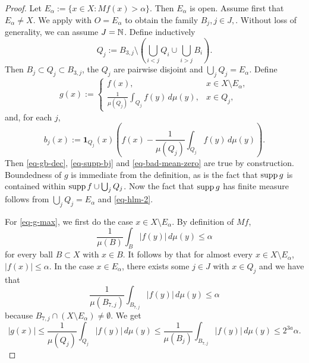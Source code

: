 \begin{proof}
\leanok
Let $E_\alpha:=\{x\in X: Mf(x)>\alpha\}$.
Then $E_\alpha$ is open. Assume first that $E_\alpha \ne X$. We apply  with $O=E_\alpha$ to obtain the family $B_j, j\in J,$. Without loss of generality, we can assume $J={\mathbb{N}}$. Define inductively
\begin{equation}
    Q_j := B_{3,j} \setminus \left(\bigcup_{i<j} Q_i \cup \bigcup_{i>j} B_i \right).
\end{equation}
Then $B_j\subset Q_j\subset B_{3,j}$, the $Q_j$ are pairwise disjoint and $\bigcup_j Q_j = E_\alpha$.
Define
\begin{equation}
    \label{eq-g-def}
    g(x):=\begin{cases}
     f(x), & x\in X\setminus E_\alpha,\\
     \frac{1}{\mu(Q_j)}\int_{Q_j} f(y)\, d\mu(y), &x\in Q_j,
    \end{cases}
\end{equation}
and, for each $j$,
\begin{equation}
    b_j(x):= \mathbf{1}_{Q_j}(x) \left(f(x)-\frac{1}{\mu(Q_j)}\int_{Q_j} f(y)\, d\mu(y) \right).
\end{equation}
Then \eqref{eq-gb-dec}, \eqref{eq-supp-bj} and \eqref{eq-bad-mean-zero} are true by construction.
Boundedness of $g$ is immediate from the definition, as is the fact that $\operatorname{\operatorname{supp}} g$ is contained within
$\operatorname{\operatorname{supp}} f \cup \bigcup_j Q_j$. Now the fact that $\operatorname{\operatorname{supp}} g$ has finite measure follows from
$\bigcup_j Q_j = E_\alpha$ and \eqref{eq-hlm-2}.

For \eqref{eq-g-max}, we first do the case $x\in X\setminus E_\alpha$. By definition of $Mf$,
\begin{equation}
    \frac{1}{\mu(B)}\int_B |f(y)|\,d\mu(y) \le \alpha
\end{equation}
for every ball $B\subset X$ with $x\in B$. It follows by  that for almost every $x\in X\setminus E_\alpha$, $|f(x)|\le \alpha$.
In the case $x\in E_\alpha$, there exists some $j\in J$ with $x\in Q_j$ and we have that
\begin{equation}
    \label{large-ball-estimate}
    \frac{1}{\mu(B_{7,j})} \int_{B_{7,j}} |f(y)| \,d\mu(y) \le \alpha
\end{equation}
because $B_{7,j}\cap (X\setminus E_\alpha) \ne \emptyset$. We get
\begin{equation}
    |g(x)| \le \frac{1}{\mu(Q_j)}\int_{Q_j} |f(y)|\, d\mu(y) \le \frac{1}{\mu(B_j)}\int_{B_{7,j}} |f(y)| \, d\mu(y) \le 2^{3a}\alpha .
\end{equation}


\end{proof}
